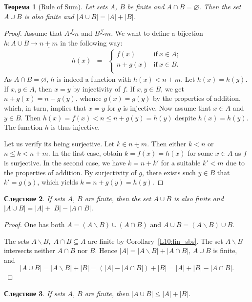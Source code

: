 \documentclass[12pt,notitlepage]{article}
\theoremstyle{plain}
\newtheorem{thm}{Теорема}[section]
\newtheorem{corr}[thm]{Следствие}
\theoremstyle{definition}
\theoremstyle{plain}
\newcommand{\sbs}{\subseteq}
\renewcommand{\setminus}{\smallsetminus}
\newcommand{\void}{\varnothing}
\newcommand{\ul}[1]{\underline{#1}}
\newcommand{\1}{\mathbf{1}}
\newcommand{\0}{\mathbf{0}}
\begin{document}
\begin{thm}[Rule of Sum]\label{L10:set_sum}
	Let sets $A$, $B$ be finite and $A \cap B = \void$. Then the set $A \cup B$ is also finite and $|A \cup B| = |A| + |B|$.
\end{thm}
\begin{proof}
	Assume that $A \stackrel{f}{\sim} \ul{n}$ and $B \stackrel{g}{\sim} \ul{m}$. We want to define a bijection $h\colon A \cup B \to \ul{n + m}$ in the following way:
	$$
	\begin{array}{rcll}
		h(x) &=& \begin{cases}
			f(x)&\mbox{if}\ x \in A;\\
			n + g(x)&\mbox{if}\ x \in B.\\
		\end{cases}
	\end{array}
	$$
	As $A \cap B = \void$, $h$ is indeed a function with $h(x) < n + m$. Let $h(x) = h(y)$. If $x, y \in A$, then $x = y$ by injectivity of $f$. If $x, y \in B$, we get $n + g(x) = n + g(y)$, whence $g(x) = g(y)$ by the properties of addition, which, in turn, implies that $x = y$ for $g$ is injective. Now assume that $x \in A$ and $y \in B$. Then $h(x) = f(x) < n \leq n + g(y) = h(y)$ despite $h(x) = h(y)$. The function $h$ is thus injective.
	
	Let us verify its being surjective. Let $k \in \ul{n + m}$. Then either $k < n$ or $n \leq k < n + m$. In the first case, obtain $k = f(x) = h(x)$ for some $x \in A$ as $f$ is surjective. In the second case, we have $k = n + k'$ for a suitable $k' < m$ due to the properties of addition. By surjectivity of $g$, there exists such $y \in B$ that $k' = g(y)$, which yields $k = n + g(y) = h(y)$.
\end{proof}

\begin{corr}\label{L10:in-ex}
	If sets $A$, $B$ are finite, then the set $A \cup B$ is also finite and
	$|A \cup B| = |A| + |B| - |A \cap B|$.
\end{corr}
\begin{proof}
	One has both $A = (A\setminus B) \cup (A \cap B)$ and $A \cup B = (A\setminus B) \cup B$.
	
	The sets $A \setminus B,\; A \cap B \sbs A$ are finite by Corollary~\ref{L10:fin_sbs}. The set $A \setminus B$ intersects neither $A \cap B$ nor $B$. Hence $|A| = |A\setminus B| + |A \cap B|$, $A \cup B$ is finite, and
	$$
	|A \cup B| = |A\setminus B| + |B| = (|A| - |A \cap B|) + |B| = |A| + |B| - |A \cap B|.
	$$
\end{proof}
\begin{corr}\label{L10:fin-union}
	If sets $A$, $B$ are finite, then $|A \cup B| \leq |A| + |B|$.
\end{corr}
\end{document}
